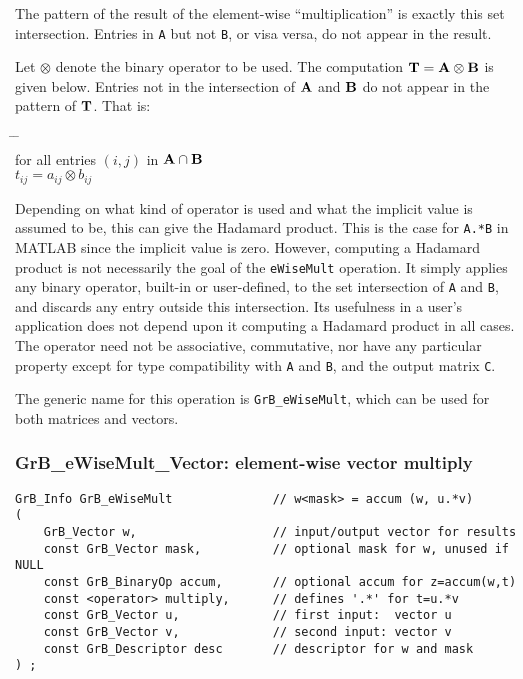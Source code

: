 \documentclass[12pt]{article}
\begin{document}
The pattern of the result of the element-wise ``multiplication'' is exactly
this set intersection.  Entries in \verb'A' but not \verb'B', or visa versa, do
not appear in the result.

Let $\otimes$ denote the binary operator to be used.  The computation ${\bf T =
A \otimes B}$ is given below.  Entries not in the intersection of ${\bf A}$ and
${\bf B}$ do not appear in the pattern of ${\bf T}$.  That is:
    \vspace{-0.2in}
    {\small
    \begin{tabbing}
    \hspace{2em} \= \hspace{2em} \= \hspace{2em} \= \\
    \> for all entries $(i,j)$ in ${\bf A \cap B}$ \\
    \> \> $t_{ij} = a_{ij} \otimes b_{ij}$ \\
    \end{tabbing} }
    \vspace{-0.2in}

Depending on what kind of operator is used and what the implicit value is
assumed to be, this can give the Hadamard product.  This is the case for
\verb'A.*B' in MATLAB since the implicit value is zero.  However, computing a
Hadamard product is not necessarily the goal of the \verb'eWiseMult' operation.
It simply applies any binary operator, built-in or user-defined, to the set
intersection of \verb'A' and \verb'B', and discards any entry outside this
intersection.  Its usefulness in a user's application does not depend upon it
computing a Hadamard product in all cases.  The operator need not be
associative, commutative, nor have any particular property except for type
compatibility with \verb'A' and \verb'B', and the output matrix \verb'C'.

The generic name for this operation is \verb'GrB_eWiseMult', which can be used
for both matrices and vectors.

\newpage
\subsubsection{{\sf GrB\_eWiseMult\_Vector:} element-wise vector multiply}
\label{eWiseMult_vector}

\begin{mdframed}[userdefinedwidth=6in]
{\footnotesize
\begin{verbatim}
GrB_Info GrB_eWiseMult              // w<mask> = accum (w, u.*v)
(
    GrB_Vector w,                   // input/output vector for results
    const GrB_Vector mask,          // optional mask for w, unused if NULL
    const GrB_BinaryOp accum,       // optional accum for z=accum(w,t)
    const <operator> multiply,      // defines '.*' for t=u.*v
    const GrB_Vector u,             // first input:  vector u
    const GrB_Vector v,             // second input: vector v
    const GrB_Descriptor desc       // descriptor for w and mask
) ;
\end{verbatim}
} \end{mdframed}
\end{document}
